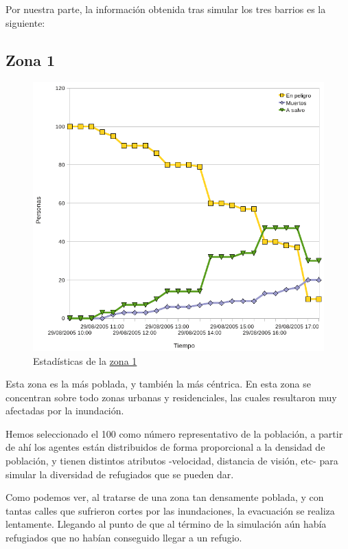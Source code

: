 Por nuestra parte, la información obtenida tras simular los tres barrios es la
siguiente:

\subsection{Zona 1}

\begin{figure}[H]
 \centering
 \includegraphics[width=135mm]{figuras/cap6/stats/Zona1.png}
 \caption{Estadísticas de la \hyperref[zona1]{zona 1}}
\end{figure}

Esta zona es la más poblada, y también la más céntrica. En esta zona se
concentran sobre todo zonas urbanas y residenciales, las cuales resultaron muy
afectadas por la inundación.

Hemos seleccionado el 100 como número representativo de la población, a
partir de ahí los agentes están distribuidos de forma proporcional a la
densidad de población, y tienen distintos atributos -velocidad, distancia de
visión, etc- para simular la diversidad de refugiados que se pueden dar.

Como podemos ver, al tratarse de una zona tan densamente poblada, y con tantas
calles que sufrieron cortes por las inundaciones, la evacuación se realiza
lentamente. Llegando al punto de que al término de la simulación aún había
refugiados que no habían conseguido llegar a un refugio.

